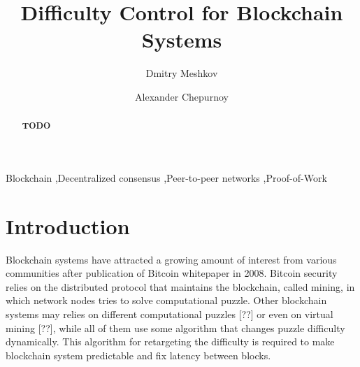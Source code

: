 \documentclass[number,preprint,review]{elsarticle}
\begin{document}
\begin{frontmatter}



\title{Difficulty Control for Blockchain Systems}



\author[iohk]{Dmitry Meshkov}

\author[iohk]{Alexander Chepurnoy}


\address[iohk]{IOHK Research}

\begin{abstract}
\textbf{TODO}
\end{abstract}

\begin{keyword}
Blockchain \sep Decentralized consensus \sep Peer-to-peer networks \sep Proof-of-Work
\end{keyword}

\end{frontmatter}


\section{Introduction}

Blockchain systems have attracted a growing amount of interest from various communities after publication of Bitcoin whitepaper \cite{Nakamoto2008} in 2008.
Bitcoin security relies on the distributed protocol that maintains the blockchain, called mining, in which network nodes tries to solve computational puzzle.
Other blockchain systems may relies on different computational puzzles [??] or even on virtual mining [??], while all of them use some algorithm that changes puzzle difficulty dynamically.
This algorithm for retargeting the difficulty is required to make blockchain system predictable and fix latency between blocks.
\end{document}
